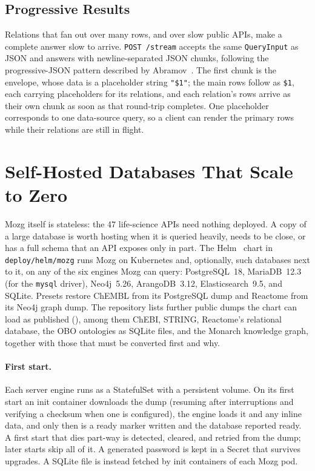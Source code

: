 \documentclass[sigconf,nonacm]{acmart}
\begin{document}
\subsection{Progressive Results}
\label{sec:stream}

Relations that fan out over many rows, and over slow public APIs, make
a complete answer slow to arrive.  \texttt{POST /stream} accepts the same
\texttt{QueryInput} as JSON and answers with newline-separated JSON
chunks, following the progressive-JSON pattern described by
Abramov~\cite{progressivejson}.  The first chunk is the envelope, whose
data is a placeholder string \texttt{"\$1"}; the main rows follow as
\texttt{\$1}, each carrying placeholders for its relations, and each
relation's rows arrive as their own chunk as soon as that round-trip
completes.  One placeholder corresponds to one data-source query, so a
client can render the primary rows while their relations are still in
flight.

\section{Self-Hosted Databases That Scale to Zero}
\label{sec:selfhost}

Mozg itself is stateless: the 47 life-science APIs need nothing
deployed.  A copy of a large database is worth hosting when it is
queried heavily, needs to be close, or has a full schema that an API
exposes only in part.  The Helm~\cite{helm} chart in
\texttt{deploy/helm/mozg} runs Mozg on Kubernetes and, optionally,
such databases next to it, on any of the six engines Mozg can query:
PostgreSQL~18, MariaDB~12.3 (for the \texttt{mysql} driver),
Neo4j~5.26, ArangoDB~3.12, Elasticsearch~9.5, and SQLite.  Presets
restore ChEMBL from its PostgreSQL dump and Reactome from its Neo4j
graph dump.  The repository lists further public dumps the chart can
load as published (), among them ChEBI, STRING,
Reactome's relational database, the OBO ontologies as SQLite files, and
the Monarch knowledge graph, together with those that must be converted
first and why.

\paragraph{First start.}
Each server engine runs as a StatefulSet with a persistent volume.  On
its first start an init container downloads the dump (resuming after
interruptions and verifying a checksum when one is configured), the
engine loads it and any inline data, and only then is a ready marker
written and the database reported ready.  A first start that dies
part-way is detected, cleared, and retried from the dump; later starts
skip all of it.  A generated password is kept in a Secret that
survives upgrades.  A SQLite file is instead fetched by init containers
of each Mozg pod.
\end{document}
